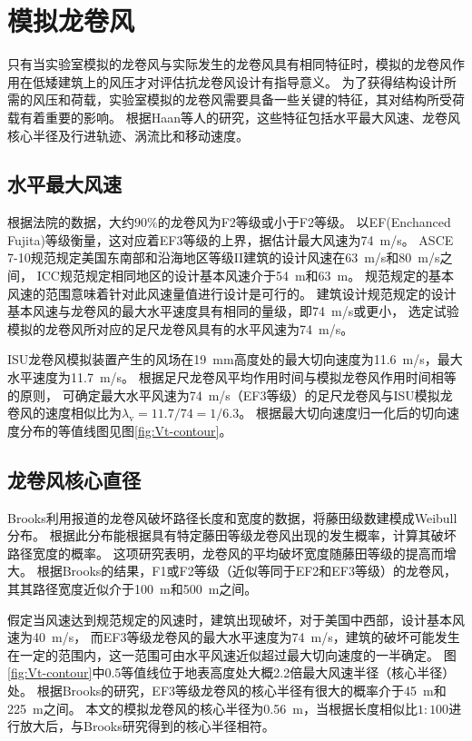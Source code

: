 \documentclass{ctexart}
\begin{document}
\section{模拟龙卷风}
只有当实验室模拟的龙卷风与实际发生的龙卷风具有相同特征时，模拟的龙卷风作用在低矮建筑上的风压才对评估抗龙卷风设计有指导意义。
为了获得结构设计所需的风压和荷载，实验室模拟的龙卷风需要具备一些关键的特征，其对结构所受荷载有着重要的影响。
根据Haan等人的研究，这些特征包括水平最大风速、龙卷风核心半径及行进轨迹、涡流比和移动速度。

\subsection{水平最大风速}
根据法院的数据，大约$90 \%$的龙卷风为F2等级或小于F2等级。
以EF(Enchanced Fujita)等级衡量，这对应着EF3等级的上界，据估计最大风速为\SI{74}{m/s}。
ASCE 7-10规范规定美国东南部和沿海地区等级II建筑的设计风速在\SI{63}{m/s}和\SI{80}{m/s}之间，
ICC规范规定相同地区的设计基本风速介于\SI{54}{m}和\SI{63}{m}。
规范规定的基本风速的范围意味着针对此风速量值进行设计是可行的。
建筑设计规范规定的设计基本风速与龙卷风的最大水平速度具有相同的量级，即\SI{74}{m/s}或更小，
选定试验模拟的龙卷风所对应的足尺龙卷风具有的水平风速为\SI{74}{m/s}。

ISU龙卷风模拟装置产生的风场在\SI{19}{mm}高度处的最大切向速度为\SI{11.6}{m/s}，最大水平速度为\SI{11.7}{m/s}。
根据足尺龙卷风平均作用时间与模拟龙卷风作用时间相等的原则，
可确定最大水平风速为\SI{74}{m/s}（EF3等级）的足尺龙卷风与ISU模拟龙卷风的速度相似比为$\lambda_{\mathrm{v}}=11.7/74=1/6.3$。
根据最大切向速度归一化后的切向速度分布的等值线图见图\ref{fig:Vt-contour}。 

\subsection{龙卷风核心直径}
Brooks利用报道的龙卷风破坏路径长度和宽度的数据，将藤田级数建模成Weibull分布。
根据此分布能根据具有特定藤田等级龙卷风出现的发生概率，计算其破坏路径宽度的概率。
这项研究表明，龙卷风的平均破坏宽度随藤田等级的提高而增大。
根据Brooks的结果，F1或F2等级（近似等同于EF2和EF3等级）的龙卷风，其其路径宽度近似介于\SI{100}{m}和\SI{500}{m}之间。

假定当风速达到规范规定的风速时，建筑出现破坏，对于美国中西部，设计基本风速为\SI{40}{m/s}，
而EF3等级龙卷风的最大水平速度为\SI{74}{m/s}，建筑的破坏可能发生在一定的范围内，这一范围可由水平风速近似超过最大切向速度的一半确定。
图\ref{fig:Vt-contour}中0.5等值线位于地表高度处大概2.2倍最大风速半径（核心半径）处。
根据Brooks的研究，EF3等级龙卷风的核心半径有很大的概率介于\SI{45}{m}和\SI{225}{m}之间。
本文的模拟龙卷风的核心半径为\SI{0.56}{m}，当根据长度相似比$1:100$进行放大后，与Brooks研究得到的核心半径相符。
\end{document}
